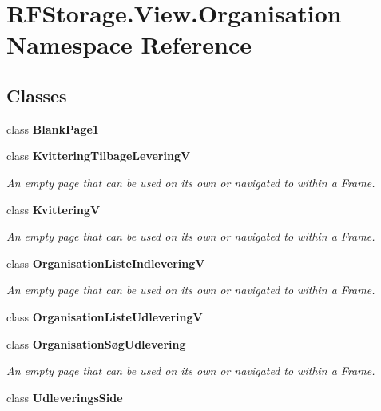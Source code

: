 \section{R\+F\+Storage.\+View.\+Organisation Namespace Reference}
\label{namespace_r_f_storage_1_1_view_1_1_organisation}
\subsection*{Classes}
\begin{DoxyCompactItemize}
\item 
class \textbf{ Blank\+Page1}
\item 
class \textbf{ Kvittering\+Tilbage\+LeveringV}
\begin{DoxyCompactList}\small\item\em An empty page that can be used on its own or navigated to within a Frame. \end{DoxyCompactList}\item 
class \textbf{ KvitteringV}
\begin{DoxyCompactList}\small\item\em An empty page that can be used on its own or navigated to within a Frame. \end{DoxyCompactList}\item 
class \textbf{ Organisation\+Liste\+IndleveringV}
\begin{DoxyCompactList}\small\item\em An empty page that can be used on its own or navigated to within a Frame. \end{DoxyCompactList}\item 
class \textbf{ Organisation\+Liste\+UdleveringV}
\item 
class \textbf{ Organisation\+Søg\+Udlevering}
\begin{DoxyCompactList}\small\item\em An empty page that can be used on its own or navigated to within a Frame. \end{DoxyCompactList}\item 
class \textbf{ Udleverings\+Side}
\end{DoxyCompactItemize}
